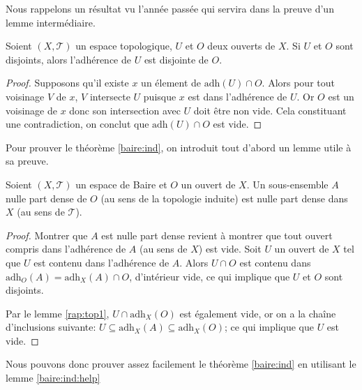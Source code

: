 Nous rappelons un résultat vu l'année passée qui servira dans la preuve
d'un lemme intermédiaire.
\begin{lem}\label{rap:top1}
  Soient $(X, \mathcal{T})$ un espace topologique, $U$ et $O$ deux ouverts
  de $X$. Si $U$ et $O$ sont disjoints, alors l'adhérence de $U$ est
  disjointe de $O$.
\end{lem}

\begin{proof}
  Supposons qu'il existe $x$ un élement de $\mathrm{adh}(U)\cap O$.
  Alors pour tout voisinage $V$ de $x$, $V$ intersecte $U$ puisque
  $x$ est dans l'adhérence de $U$. Or $O$ est un voisinage de $x$
  donc son intersection avec $U$ doit être non vide. Cela constituant
  une contradiction, on conclut que $\mathrm{adh}(U)\cap O$ est vide.
\end{proof}


Pour prouver le théorème \ref{baire:ind},
on introduit tout d'abord un lemme utile
à sa preuve.
\begin{lem}\label{baire:ind:help}
  Soient $(X, \mathcal{T})$ un espace de Baire et $O$ un ouvert de $X$.
  Un sous-ensemble $A$ nulle part dense de $O$ (au sens de la topologie
  induite) est nulle part dense dans $X$ (au sens de $\mathcal{T}$).
\end{lem}

\begin{proof}
  Montrer que $A$ est nulle part dense revient à montrer que
  tout ouvert compris dans l'adhérence de $A$ (au sens de $X$) est vide. Soit $U$
  un ouvert de $X$ tel que $U$ est contenu dans l'adhérence
  de $A$. Alors $U\cap O$ est contenu dans $\mathrm{adh}_O(A) =
  \mathrm{adh}_X(A)\cap O$, d'intérieur vide, ce qui implique que $U$ et $O$
  sont disjoints.

  Par le lemme \ref{rap:top1}, $U\cap \mathrm{adh}_X(O)$
  est également vide, or on a la chaîne d'inclusions suivante:
  $U\subseteq \mathrm{adh}_X(A)\subseteq \mathrm{adh}_X(O)$;
  ce qui implique que $U$ est vide.
\end{proof}

Nous pouvons donc prouver assez facilement le théorème \ref{baire:ind} en utilisant
le lemme \ref{baire:ind:help}

